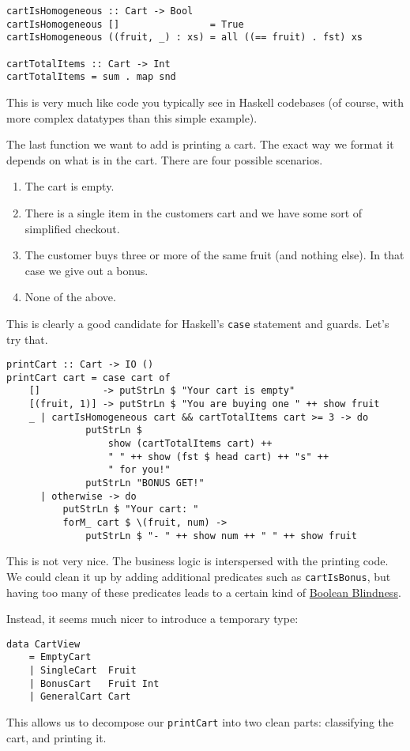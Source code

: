 \begin{verbatim}
cartIsHomogeneous :: Cart -> Bool
cartIsHomogeneous []                = True
cartIsHomogeneous ((fruit, _) : xs) = all ((== fruit) . fst) xs

cartTotalItems :: Cart -> Int
cartTotalItems = sum . map snd
\end{verbatim}
This is very much like code you typically see in Haskell codebases (of course, with more complex datatypes than this simple example).

The last function we want to add is printing a cart. The exact way we format it depends on what is in the cart. There are four possible scenarios.

\begin{enumerate}
\item The cart is empty.
\item There is a single item in the customers cart and we have some sort of simplified checkout.
\item The customer buys three or more of the same fruit (and nothing else). In that case we give out a bonus.
\item None of the above.
\end{enumerate}
This is clearly a good candidate for Haskell's \texttt{case} statement and guards. Let's try that.

\begin{verbatim}
printCart :: Cart -> IO ()
printCart cart = case cart of
    []           -> putStrLn $ "Your cart is empty"
    [(fruit, 1)] -> putStrLn $ "You are buying one " ++ show fruit
    _ | cartIsHomogeneous cart && cartTotalItems cart >= 3 -> do
              putStrLn $
                  show (cartTotalItems cart) ++
                  " " ++ show (fst $ head cart) ++ "s" ++
                  " for you!"
              putStrLn "BONUS GET!"
      | otherwise -> do
          putStrLn $ "Your cart: "
          forM_ cart $ \(fruit, num) ->
              putStrLn $ "- " ++ show num ++ " " ++ show fruit
\end{verbatim}
This is not very nice. The business logic is interspersed with the printing code. We could clean it up by adding additional predicates such as \texttt{cartIsBonus}, but having too many of these predicates leads to a certain kind of \href{https://existentialtype.wordpress.com/2011/03/15/boolean-blindness/}{Boolean Blindness}.

Instead, it seems much nicer to introduce a temporary type:

\begin{verbatim}
data CartView
    = EmptyCart
    | SingleCart  Fruit
    | BonusCart   Fruit Int
    | GeneralCart Cart
\end{verbatim}
This allows us to decompose our \texttt{printCart} into two clean parts: classifying the cart, and printing it.

